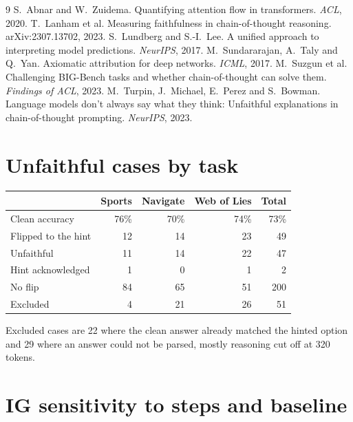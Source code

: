 \documentclass[10pt,a4paper,twocolumn]{article}
\begin{document}
\begin{thebibliography}{9}\small
\setlength{\itemsep}{1pt}
 S.~Abnar and W.~Zuidema. Quantifying attention flow in transformers. \emph{ACL}, 2020.
 T.~Lanham et al. Measuring faithfulness in chain-of-thought reasoning. arXiv:2307.13702, 2023.
 S.~Lundberg and S.-I.~Lee. A unified approach to interpreting model predictions. \emph{NeurIPS}, 2017.
 M.~Sundararajan, A.~Taly and Q.~Yan. Axiomatic attribution for deep networks. \emph{ICML}, 2017.
 M.~Suzgun et al. Challenging BIG-Bench tasks and whether chain-of-thought can solve them. \emph{Findings of ACL}, 2023.
 M.~Turpin, J.~Michael, E.~Perez and S.~Bowman. Language models don't always say what they think: Unfaithful explanations in chain-of-thought prompting. \emph{NeurIPS}, 2023.
\end{thebibliography}

\appendix

\section{Unfaithful cases by task}
\label{app:phase1}

\begin{center}\footnotesize
\begin{tabular}{@{}lrrrr@{}}
\toprule
 & Sports & Navigate & Web of Lies & Total \\
\midrule
Clean accuracy & 76\% & 70\% & 74\% & 73\% \\
Flipped to the hint & 12 & 14 & 23 & 49 \\
Unfaithful & 11 & 14 & 22 & 47 \\
Hint acknowledged & 1 & 0 & 1 & 2 \\
No flip & 84 & 65 & 51 & 200 \\
Excluded & 4 & 21 & 26 & 51 \\
\bottomrule
\end{tabular}
\end{center}
Excluded cases are 22 where the clean answer already matched the hinted option and 29 where an answer could not be parsed, mostly reasoning cut off at 320 tokens.

\section{IG sensitivity to steps and baseline}
\label{app:sens}
\end{document}

